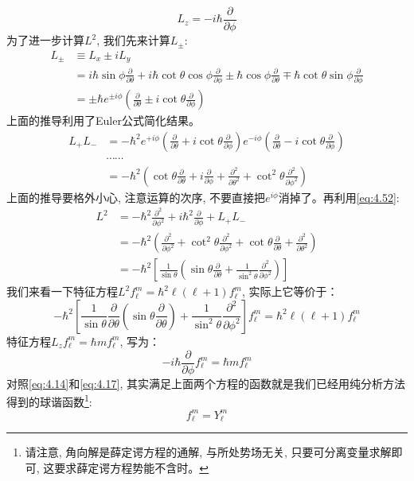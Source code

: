 \documentclass[a4paper,zihao=-4,linespread=1]{ctexrep}
\begin{document}
    \begin{equation}
        \boxed{
            L_z = -i\hbar\frac{\partial}{\partial\phi}
        }
    \end{equation}
    为了进一步计算$L^2$, 我们先来计算$L_\pm$:
    \begin{align*}
        L_\pm&\equiv L_x\pm iL_y\\
             &=i\hbar\sin\phi\frac{\partial}{\partial\theta}+i\hbar\cot\theta\cos\phi\frac{\partial}{\partial\phi}\pm\hbar\cos\phi\frac{\partial}{\partial\theta}\mp\hbar\cot\theta\sin\phi\frac{\partial}{\partial\phi}\\
             &=\pm\hbar e^{\pm i\phi}\left(\frac{\partial}{\partial\theta}\pm i\cot\theta\frac{\partial}{\partial\phi}\right)
    \end{align*}
    上面的推导利用了Euler公式简化结果。
    \begin{align*}
        L_+L_-&=-\hbar^2 e^{+i\phi}\left(\frac{\partial}{\partial\theta}+ i\cot\theta\frac{\partial}{\partial\phi}\right)e^{- i\phi}\left(\frac{\partial}{\partial\theta}-i\cot\theta\frac{\partial}{\partial\phi}\right)\\
              &\cdots\cdots\\
              &=-\hbar^2 \left(\cot\theta\frac{\partial}{\partial \theta}+i\frac{\partial}{\partial\phi}+\frac{\partial^2}{\partial\theta^2}+\cot^2\theta\frac{\partial^2}{\partial\phi^2}\right)
    \end{align*}
    上面的推导要格外小心, 注意运算的次序, 不要直接把$e^{i\phi}$消掉了。再利用\ref{eq:4.52}:
    \begin{align*}
        L^2&=-\hbar^2\frac{\partial^2}{\partial\phi^2}+i\hbar^2\frac{\partial}{\partial\phi}+L_+L_-\\
           &=-\hbar^2\left(\frac{\partial^2}{\partial\phi^2}+\cot^2\theta\frac{\partial^2}{\partial\phi^2}+\cot\theta\frac{\partial}{\partial\theta}+\frac{\partial^2}{\partial\theta^2}\right)\\
           &=-\hbar^2\left[\frac{1}{\sin\theta}\left(\sin\theta\frac{\partial}{\partial\theta}+\frac{1}{\sin^2\theta}\frac{\partial^2}{\partial\phi^2}\right)\right]
    \end{align*}
    我们来看一下特征方程$L^2f_\ell^m=\hbar^2\ell\left(\ell+1\right)f_\ell^m$, 实际上它等价于：
    \begin{equation}
        -\hbar^2\left[\frac{1}{\sin\theta}\frac{\partial}{\partial\theta}\left(\sin\theta\frac{\partial}{\partial\theta}\right)+\frac{1}{\sin^2\theta}\frac{\partial^2}{\partial\phi^2}\right]f_\ell^m=\hbar^2\ell\left(\ell+1\right)f_\ell^m
    \end{equation}
    特征方程$L_zf_\ell^m=\hbar mf_\ell^m$, 写为：
    \begin{equation}
        -i\hbar\frac{\partial}{\partial\phi}f_\ell^m=\hbar mf_\ell^m
    \end{equation}
    对照\ref{eq:4.14}和\ref{eq:4.17}, 其实满足上面两个方程的函数就是我们已经用纯分析方法得到的球谐函数\footnote{请注意, 角向解是薛定谔方程的通解, 与所处势场无关, 只要可分离变量求解即可, 这要求薛定谔方程势能不含时。}:
    \[f_\ell^m=Y_\ell^m\]
\end{document}
